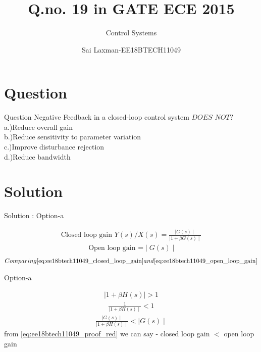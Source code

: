 \documentclass{beamer}
\title[Laxman]{Q.no. 19 in GATE ECE 2015  }
\subtitle{Control Systems}
\author{Sai Laxman-EE18BTECH11049}
\begin{document}
\begin{frame}
\titlepage    
\end{frame}



\section{Question}


\begin{frame}{ Question}
Negative Feedback in a closed-loop control system $DOES$ $ NOT ?$\\

  a.)Reduce overall gain\\
  b.)Reduce sensitivity to parameter variation\\
  c.)Improve disturbance rejection \\
  d.)Reduce bandwidth\\
  
\end{frame}





\section{Solution}




\begin{frame}{Solution : Option-a }

\begin{figure}
    \resizebox{.6\columnwidth}{!}{}
\end{figure}

\begin{align}
\text{Closed loop gain }
 Y(s)/X(s) = \frac {\mid G(s) \mid}{ \mid 1+\beta G(s) \mid}
 \label{eq:ee18btech11049_closed_loop_gain}
\end{align}
\begin{align}
  \text{ Open loop gain =}  \mid G(s) \mid
  \label{eq:ee18btech11049_open_loop_gain}
\end{align}
\begin{align}
    Comparing \eqref{eq:ee18btech11049_closed_loop_gain} and \eqref{eq:ee18btech11049_open_loop_gain} 
\end{align}

\end{frame}


\begin{frame}{Option-a }

\begin{align}
    \mid1+\beta H(s)\mid  > 1
\end{align}
\begin{align}
    \frac{1}{\mid1+\beta H(s)\mid}  < 1
\end{align}
\begin{align}
    \frac{\mid G(s) \mid}{\mid1+\beta H(s)\mid}  < \mid G(s) \mid
    \label{eq:ee18btech11049_proof_red}
\end{align}
from \eqref{eq:ee18btech11049_proof_red} we can say  - closed loop gain $<$ open loop gain
\end{frame}
\end{document}
